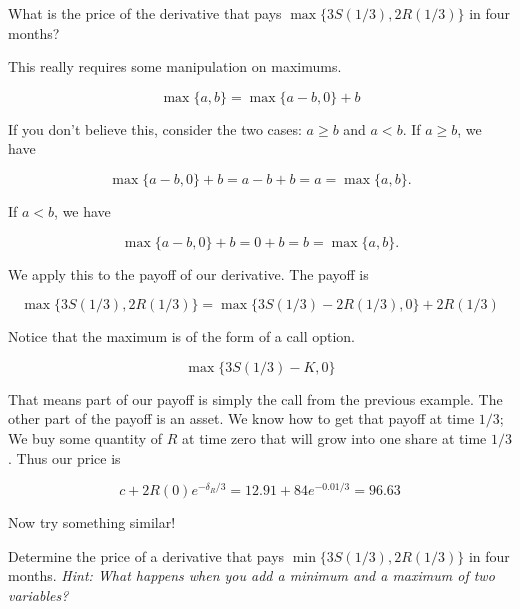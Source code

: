 \documentclass{ximera}
\begin{document}
\begin{example}
What is the price of the derivative that pays $\max\{3S(1/3), 2R(1/3)\}$ in four months?
\end{example}

\begin{solution}
This really requires some manipulation on maximums.

	\begin{equation*}
	\max\{a,b\}=\max\{a-b,0\}+b
	\end{equation*}

If you don't believe this, consider the two cases: $a\geq b$ and $a<b$. If $a\geq b$, we have

	\begin{equation*}
	\max\{a-b,0\}+b=a-b+b=a=\max\{a,b\}.
	\end{equation*}

If $a<b$, we have

	\begin{equation*}
	\max\{a-b,0\}+b=0+b=b=\max\{a,b\}.
	\end{equation*}

We apply this to the payoff of our derivative. The payoff is

	\begin{equation*}
	\max\{3S(1/3),2R(1/3)\}=\max\{3S(1/3)-2R(1/3),0\}+2R(1/3)
	\end{equation*}

Notice that the maximum is of the form of a call option.

	\begin{equation*}
	\max\{3S(1/3)-K,0\}
	\end{equation*}

That means part of our payoff is simply the call from the previous example. The other part of the payoff is an asset. We know how to get that payoff at time $1/3$; We buy some quantity of $R$ at time zero that will grow into one share at time $1/3$. Thus our price is

	\begin{equation*}
	c+2R(0)e^{-\delta_R/3}=12.91+84e^{-0.01/3}=96.63
	\end{equation*}

\end{solution}

Now try something similar!

\begin{question}
Determine the price of a derivative that pays $\min\{3S(1/3),2R(1/3)\}$ in four months. \textit{Hint: What happens when you add a minimum and a maximum of two variables?}
\end{question}
\end{document}
